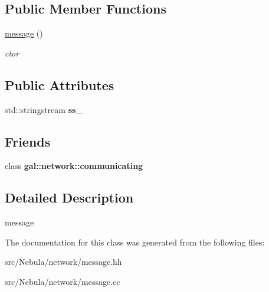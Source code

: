 \subsection*{\-Public \-Member \-Functions}
\begin{DoxyCompactItemize}
\item 
\hypertarget{classgal_1_1network_1_1message_aeec430b4ea74cce419d9a5ab771ebf25}{\hyperlink{classgal_1_1network_1_1message_aeec430b4ea74cce419d9a5ab771ebf25}{message} ()}\label{classgal_1_1network_1_1message_aeec430b4ea74cce419d9a5ab771ebf25}

\begin{DoxyCompactList}\small\item\em ctor \end{DoxyCompactList}\end{DoxyCompactItemize}
\subsection*{\-Public \-Attributes}
\begin{DoxyCompactItemize}
\item 
\hypertarget{classgal_1_1network_1_1message_a939d7b5d4f7dd24dbe4dd4be8e719da8}{std\-::stringstream {\bfseries ss\-\_\-}}\label{classgal_1_1network_1_1message_a939d7b5d4f7dd24dbe4dd4be8e719da8}

\end{DoxyCompactItemize}
\subsection*{\-Friends}
\begin{DoxyCompactItemize}
\item 
\hypertarget{classgal_1_1network_1_1message_a8963f6c475f2812300781c41bc93ae55}{class {\bfseries gal\-::network\-::communicating}}\label{classgal_1_1network_1_1message_a8963f6c475f2812300781c41bc93ae55}

\end{DoxyCompactItemize}


\subsection{\-Detailed \-Description}
message 

\-The documentation for this class was generated from the following files\-:\begin{DoxyCompactItemize}
\item 
src/\-Nebula/network/message.\-hh\item 
src/\-Nebula/network/message.\-cc\end{DoxyCompactItemize}
